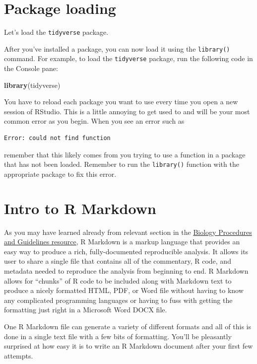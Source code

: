 \documentclass[
]{book}
\newenvironment{Shaded}{\begin{snugshade}}{\end{snugshade}}
\newcommand{\FunctionTok}[1]{\textcolor[rgb]{0.13,0.29,0.53}{\textbf{#1}}}
\newcommand{\NormalTok}[1]{#1}
\begin{document}
\section{Package loading}\label{package_load}

Let's load the \texttt{tidyverse} package.

After you've installed a package, you can now load it using the \texttt{library()} command. For example, to load the \texttt{tidyverse} package, run the following code in the Console pane:

\begin{Shaded}
\begin{Highlighting}[]
\FunctionTok{library}\NormalTok{(tidyverse)}
\end{Highlighting}
\end{Shaded}

You have to reload each package you want to use every time you open a new session of RStudio. This is a little annoying to get used to and will be your most common error as you begin. When you see an error such as

\begin{verbatim}
Error: could not find function
\end{verbatim}

remember that this likely comes from you trying to use a function in a package that has not been loaded. Remember to run the \texttt{library()} function with the appropriate package to fix this error.

\section{Intro to R Markdown}\label{intro_markdown}

As you may have learned already from relevant section in the \href{https://ubco-biology.github.io/Procedures-and-Guidelines/markdown-1.html}{Biology Procedures and Guidelines resource}, R Markdown is a markup language that provides an easy way to produce a rich, fully-documented reproducible analysis. It allows its user to share a single file that contains all of the commentary, R code, and metadata needed to reproduce the analysis from beginning to end. R Markdown allows for ``chunks'' of R code to be included along with Markdown text to produce a nicely formatted HTML, PDF, or Word file without having to know any complicated programming languages or having to fuss with getting the formatting just right in a Microsoft Word DOCX file.

One R Markdown file can generate a variety of different formats and all of this is done in a single text file with a few bits of formatting. You'll be pleasantly surprised at how easy it is to write an R Markdown document after your first few attempts.
\end{document}
